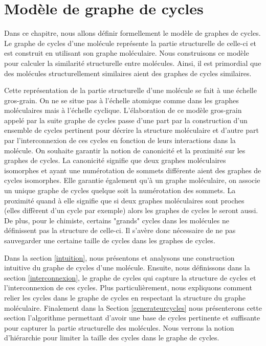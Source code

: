 \chapter{Modèle de graphe de cycles}
\label{chap3}


Dans ce chapitre, nous allons définir formellement le modèle de graphes de cycles. Le graphe de cycles d'une molécule représente la partie structurelle de  celle-ci et est construit en utilisant son graphe moléculaire. Nous construisons ce modèle pour calculer la similarité structurelle entre molécules. Ainsi, il est primordial que des molécules structurellement similaires aient des graphes de cycles similaires. 

Cette représentation de la partie structurelle d'une molécule se fait à une échelle gros-grain. On ne se situe pas à l'échelle atomique comme dans les graphes moléculaires mais à l'échelle cyclique. L'élaboration de ce modèle gros-grain appelé par la suite graphe de cycles passe d'une part par la construction d'un ensemble de cycles pertinent pour décrire la structure moléculaire et d'autre part par l'interconnexion de ces cycles en fonction de leurs interactions dans la molécule. On souhaite garantir la notion de canonicité et la proximité sur les graphes de cycles.  La canonicité signifie que deux graphes moléculaires isomorphes et ayant une numérotation de sommets différente aient des graphes de cycles isomorphes. Elle garantie également qu'à un graphe moléculaire, on associe un unique graphe de cycles quelque soit la numérotation des sommets. La proximité quand à elle signifie que si deux graphes moléculaires sont proches (elles diffèrent d'un cycle par exemple) alors les graphes de cycles le seront aussi. De plus, pour le chimiste, certains "grands" cycles dans les molécules ne définissent pas la structure de celle-ci. Il s'avère donc nécessaire de ne pas sauvegarder une certaine taille de cycles dans les graphes de cycles.

Dans la section \ref{intuition}, nous présentons et analysons une construction intuitive du graphe de cycles d'une molécule. Ensuite, nous définissons dans la section \ref{interconnexion}, le graphe de cycles qui capture la structure de cycles et l'interconnexion de ces cycles. Plus particulièrement, nous expliquons comment relier les cycles dans le graphe de cycles en respectant la structure du graphe moléculaire. Finalement dans la Section \ref{generateurcycles} nous présenterons cette section l'algorithme permettant d'avoir une base de cycles pertinente et suffisante pour capturer la partie structurelle des molécules. Nous verrons la notion d'hiérarchie pour limiter la taille des cycles dans le graphe de cycles.

